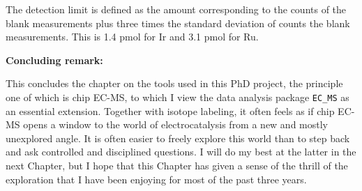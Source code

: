 The detection limit is defined as the amount corresponding to the counts of the blank measurements plus three times the standard deviation of counts the blank measurements\cite{Harris2010}. This is 1.4 pmol for Ir and 3.1 pmol for Ru.

\textbf{Concluding remark:}

This concludes the chapter on the tools used in this PhD project, the principle one of which is chip EC-MS, to which I view the data analysis package \texttt{EC\_MS} as an essential extension. Together with isotope labeling, it often feels as if chip EC-MS opens a window to the world of electrocatalysis from a new and mostly unexplored angle. It is often easier to freely explore this world than to step back and ask controlled and disciplined questions. I will do my best at the latter in the next Chapter, but I hope that this Chapter has given a sense of the thrill of the exploration that I have been enjoying for most of the past three years.
